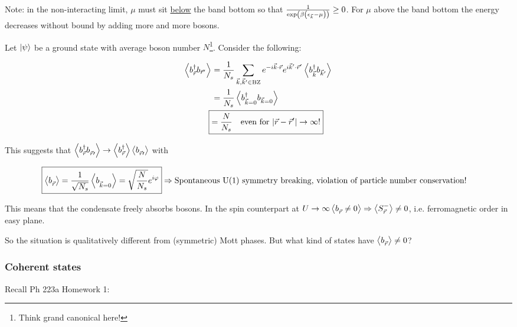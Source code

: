 \documentclass{article}
\newcommand{\egreg}{\vphantom{-}} %
\begin{document}

Note: in the non-interacting limit, $\mu$ must sit \underline{below} the band bottom so that $\frac{1}{\exp(\beta\qty(\epsilon_{\vec{k}} - \mu))} \ge 0$. For $\mu$ above the band bottom the energy decreases without bound by adding more and more bosons.

Let $\ket{\psi}$ be a ground state with average boson number $N$\footnote{Think grand canonical here!}. Consider the following:

\begin{align*}
    \expval{b_{\vec{r}}^{\dagger} b_{\vec{r}'}}^{\egreg} &= \dfrac{1}{N_s} \sum_{\vec{k}, \vec{k}' \in \textrm{BZ}} e^{- i \vec{k}\cdot\vec{r}} e^{ i \vec{k}'\cdot\vec{r}'} \expval{b_{\vec{k}}^{\dagger} b_{\vec{k}'}}^{\egreg} \\
    &= \dfrac{1}{N_s}\expval{b_{\vec{k}=0}^{\dagger}b_{\vec{k}=0}}^{\egreg} \\
    \Aboxed{&= \dfrac{N}{N_s} \quad \textrm{even for } |\vec{r}-\vec{r}'|\rightarrow\infty!}
\end{align*}

This suggests that $\expval{b_{\vec{r}}^{\dagger}b_{\vec{r}\prime}^{\egreg}} \rightarrow \expval{b_{\vec{r}}^{\dagger}} \expval{b_{\vec{r}\prime}^{\egreg}}$ with  %

\begin{align}\label{eq:arbu1phase}
    \Aboxed{\expval{b_{\vec{r}}^{\egreg}} = \dfrac{1}{\sqrt{N_s}} \expval{b_{\vec{k}=0}^{\egreg}} = \sqrt{\dfrac{N}{N_s}} e^{i\varphi}} \Rightarrow 
    \textrm{Spontaneous U(1) symmetry breaking, violation of particle number conservation!}
\end{align}


This means that the condensate freely absorbs bosons. In the spin counterpart at $U \rightarrow \infty \expval{b_{\vec{r}}^{\egreg} \neq 0} \Rightarrow \expval{S_{\vec{r}}^-} \neq 0$, i.e. ferromagnetic order in easy plane. %

So the situation is qualitatively different from (symmetric) Mott phases. But what kind of states have $\expval{b_{\vec{r}}^{\egreg}} \neq 0$?

\subsubsection*{Coherent states}

Recall Ph 223a Homework 1:
\end{document}
